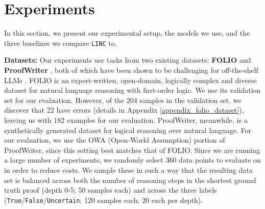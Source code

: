 \documentclass[11pt]{article}
\newcommand{\txo}[1]{\textcolor{blue}{}}
\newcommand{\txo}[1]{\textcolor{blue}{\bf\small [TXO: #1]}}
\begin{document}
\section{Experiments}\label{sec:experiments}
In this section, we present our experimental setup, the models we use, and the three baselines we compare \texttt{LINC} to.


\textbf{Datasets:} Our experiments use tasks from two existing datasets: \textbf{FOLIO} \cite{han2022folio} and \textbf{ProofWriter} \cite{tafjord2020proofwriter}, both of which have been shown to be challenging for off-the-shelf LLMs \cite{han2022folio, creswell2022selection}. FOLIO is an expert-written, open-domain, logically complex and diverse dataset for natural language reasoning with first-order logic. We use its validation set for our evaluation. However, of the 204 samples in the validation set, we discover that 22 have errors (details in Appendix \ref{appendix_folio_dataset}), leaving us with 182 examples for our evaluation. ProofWriter, meanwhile, is a synthetically generated dataset for logical reasoning over natural language. For our evaluation, we use the OWA (Open-World Assumption) portion of ProofWriter, since this setting best matches that of FOLIO. Since we are running a large number of experiments, we randomly select 360 data points to evaluate on in order to reduce costs. We sample these in such a way that the resulting data set is balanced across both the number of reasoning steps in the shortest ground truth proof (depth 0-5; 50 samples each) and across the three labels (\texttt{True}/\texttt{False}/\texttt{Uncertain}; 120 samples each; 20 each per depth).

\end{document}
